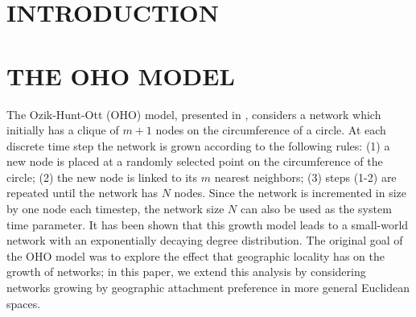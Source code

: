 \documentclass[aps,pre,reprint,superscriptaddress,amsmath,amssymb,nofootinbib]{revtex4-1}
\begin{document}

\maketitle

\section{INTRODUCTION}

\section{THE OHO MODEL}
The Ozik-Hunt-Ott (OHO) model, presented in \cite{ozik2004}, considers a network which initially has a clique of $m+1$ nodes on the circumference of a circle. 
At each discrete time step the network is grown according to the following rules: 
(1) a new node is placed at a randomly selected point on the circumference of the circle;
(2) the new node is linked to its $m$ nearest neighbors;
(3) steps (1-2) are repeated until the network has $N$ nodes.
Since the network is incremented in size by one node each timestep, the network size $N$ can also be used as the system time parameter.  
It has been shown \cite{ozik2004} that this growth model leads to a small-world network with an exponentially decaying degree distribution. 
The original goal of the OHO model was to explore the effect that geographic locality has on the growth of networks; in this paper, we extend this analysis by considering networks growing by geographic attachment preference in more general Euclidean spaces. 
\end{document}
